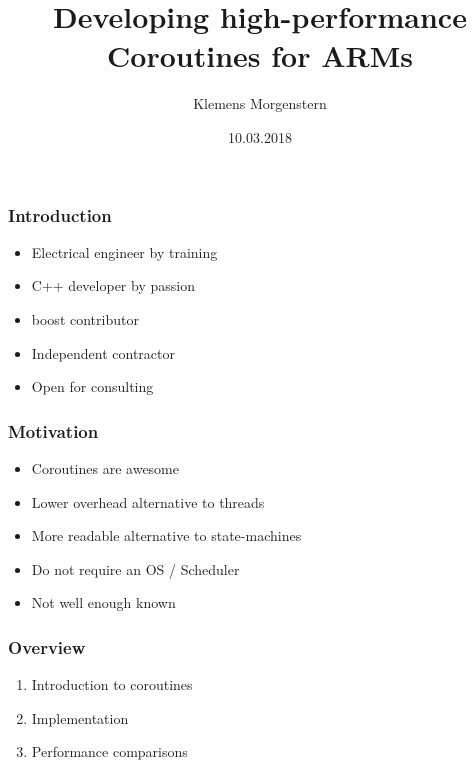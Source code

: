 \documentclass{beamer}
\begin{document}


\title{Developing high-performance Coroutines for ARMs}
\author{Klemens Morgenstern}
\date{10.03.2018}

\frame{\titlepage}

\begin{frame}
\frametitle{Introduction}
\begin{itemize}
\item Electrical engineer by training
\item C++ developer by passion
\item boost contributor
\item Independent contractor
\item Open for consulting
\end{itemize}
\end{frame}

\begin{frame}
\frametitle{Motivation}
\begin{itemize}
\item<1-> Coroutines are awesome
\item<2-> Lower overhead alternative to threads 
\item<3-> More readable alternative to state-machines
\item<4-> Do not require an OS / Scheduler
\item<5-> Not well enough known 
\end{itemize}
\end{frame}


\begin{frame}
\frametitle{Overview}
\begin{enumerate}
\item<1-> Introduction to coroutines
\item<2-> Implementation
\item<3-> Performance comparisons
\end{enumerate}
\end{frame}
\end{document}
